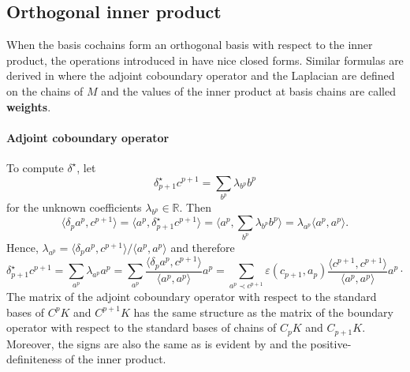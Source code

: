\documentclass{elsarticle}
\theoremstyle{definition}
\newcommand{\R}{\mathbb{R}} %
\newcommand{\inner}[2]{\langle#1,#2\rangle}
\begin{document}
\subsection{Orthogonal inner product}
\label{sec:inner_orthogonal}
When the basis cochains form an orthogonal basis with respect to the inner product, the operations introduced in  have nice closed forms. Similar formulas are derived in \cite[Section 2]{Forman2003_Bochner} where the adjoint coboundary operator and the Laplacian are defined on the chains of $M$ and the values of the inner product at basis chains are called \textbf{weights}.

\paragraph{Adjoint coboundary operator}
To compute $\delta^{\star}$, let 
\begin{equation*}
  \delta^{\star}_{p + 1} c^{p + 1} = \sum_{b^p} \lambda_{b^p} b^p
\end{equation*} 
for the unknown coefficients $\lambda_{b^p} \in \R$. Then
\begin{equation*}
  \inner{\delta_p a^p}{c^{p + 1}}
    = \inner{a^p}{\delta^{\star}_{p + 1} c^{p + 1}} 
    = \inner{a^p}{\sum_{b^p} \lambda_{b^p} b^p} 
    = \lambda_{a^p} \inner{a^p}{a^p}.
\end{equation*}
Hence, $\lambda_{a^p} = \inner{\delta_p a^p}{c^{p + 1}} / \inner{a^p}{a^p}$ and therefore
\begin{equation}
\label{eq:adjoint_coboundary}
  \delta^{\star}_{p + 1} c^{p + 1} 
    = \sum_{a^p} \lambda_{a^p} a^p
    = \sum_{a^p} \frac{\inner{\delta_p a^p}{c^{p + 1}}}{\inner{a^p}{a^p}} a^p 
    = \sum_{a^p \prec c^{p + 1}}
        \varepsilon(c_{p + 1}, a_p)
        \frac{\inner{c^{p + 1}}{c^{p + 1}}}{\inner{a^p}{a^p}} a^p \cdot
\end{equation}
The matrix of the adjoint coboundary operator with respect to the standard bases of $C^p K$ and $C^{p +1} K$ has the same structure as the matrix of the boundary operator with respect to the standard bases of chains of $C_p K$ and $C_{p +1} K$. Moreover, the signs are also the same as is evident by  and the positive-definiteness of the inner product.
\end{document}
